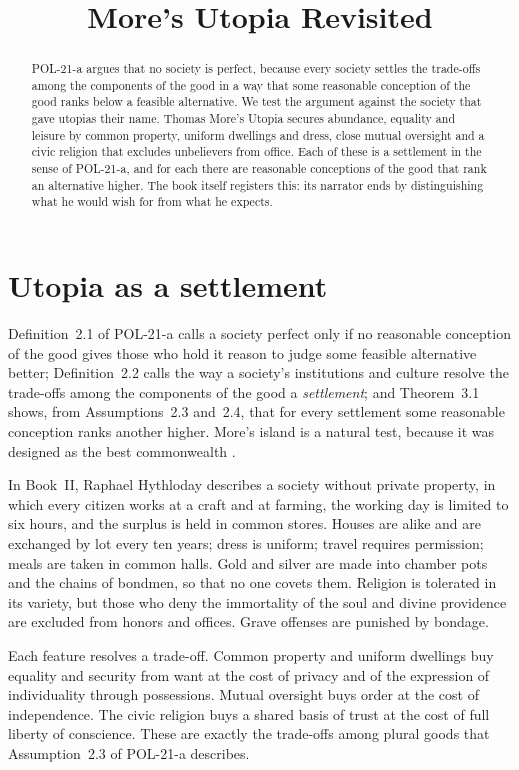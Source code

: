 \documentclass{situationist-preprint}
\title{More's Utopia Revisited}
\begin{document}
\maketitle

\begin{abstract}
POL-21-a argues that no society is perfect, because every society settles the trade-offs among the components of the good in a way that some reasonable conception of the good ranks below a feasible alternative. We test the argument against the society that gave utopias their name. Thomas More's Utopia secures abundance, equality and leisure by common property, uniform dwellings and dress, close mutual oversight and a civic religion that excludes unbelievers from office. Each of these is a settlement in the sense of POL-21-a, and for each there are reasonable conceptions of the good that rank an alternative higher. The book itself registers this: its narrator ends by distinguishing what he would wish for from what he expects.
\end{abstract}

\section{Utopia as a settlement}

Definition~2.1 of POL-21-a calls a society perfect only if no reasonable conception of the good gives those who hold it reason to judge some feasible alternative better; Definition~2.2 calls the way a society's institutions and culture resolve the trade-offs among the components of the good a \emph{settlement}; and Theorem~3.1 shows, from Assumptions~2.3 and~2.4, that for every settlement some reasonable conception ranks another higher. More's island is a natural test, because it was designed as the best commonwealth \citep{More1516}.

In Book~II, Raphael Hythloday describes a society without private property, in which every citizen works at a craft and at farming, the working day is limited to six hours, and the surplus is held in common stores. Houses are alike and are exchanged by lot every ten years; dress is uniform; travel requires permission; meals are taken in common halls. Gold and silver are made into chamber pots and the chains of bondmen, so that no one covets them. Religion is tolerated in its variety, but those who deny the immortality of the soul and divine providence are excluded from honors and offices. Grave offenses are punished by bondage.

Each feature resolves a trade-off. Common property and uniform dwellings buy equality and security from want at the cost of privacy and of the expression of individuality through possessions. Mutual oversight buys order at the cost of independence. The civic religion buys a shared basis of trust at the cost of full liberty of conscience. These are exactly the trade-offs among plural goods that Assumption~2.3 of POL-21-a describes.
\end{document}
